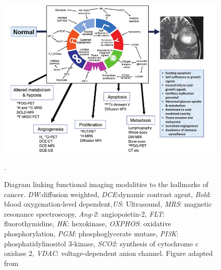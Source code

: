 \documentclass[12pt]{article}
\begin{document}




\begin{figure}[H]
\centering
\includegraphics[scale=0.6]{Padhani_2010_hallmarks.jpg}
\caption{Diagram linking functional imaging modalities to the hallmarks of cancer. \textit{DW}:diffusion weighted, \textit{DCE}:dynamic contrast agent, \textit{Bold}: blood oxygenation-level dependent,\textit{US}: Ultrasound, \textit{MRS}: magnetic resonance spectroscopy, \textit{Ang-2}: angiopoietin-2, \textit{FLT}: fluorothymidine, \textit{HK}: hexokinase, \textit{OXPHOS}: oxidative phosphorylation, \textit{PGM}: phosphoglycerate mutase, \textit{PI3K}: phosphatidylinositol 3-kinase, \textit{SCO2}: synthesis of cytochrome c oxidase 2, \textit{VDAC}: voltage-dependent anion channel. Figure adapted from \cite{Padhani:2010hfa}}.
\label{fig:padhani}
\end{figure}

\end{document}
